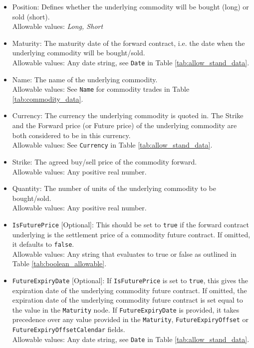 \begin{itemize}
\item Position: Defines whether the underlying commodity will be bought (long) or sold (short). \\
Allowable values: \emph{Long, Short}

\item Maturity: The maturity date of the forward contract, i.e. the date when the underlying commodity will be bought/sold. \\
Allowable values: Any date string, see \lstinline!Date! in Table \ref{tab:allow_stand_data}.

\item Name: The name of the underlying commodity. \\
Allowable values:  See \lstinline!Name! for commodity trades in Table \ref{tab:commodity_data}. \\

\item Currency: The  currency the underlying commodity is quoted in. The Strike and the Forward price (or Future price) of the underlying commodity are both considered to be in this currency.   \\
Allowable values:  See \lstinline!Currency! in Table \ref{tab:allow_stand_data}.	

\item Strike: The agreed buy/sell price of the commodity forward. \\
Allowable values:  Any positive real number.

\item Quantity: The number of units of the underlying commodity to be bought/sold. \\
Allowable values:  Any positive real number.

\item \lstinline!IsFuturePrice! [Optional]: This should be set to \lstinline!true! if the forward contract underlying is the settlement price of a commodity future contract. If omitted, it defaults to \lstinline!false!. \\
Allowable values: Any string that evaluates to true or false as outlined in Table \ref{tab:boolean_allowable}.

\item \lstinline!FutureExpiryDate! [Optional]: If \lstinline!IsFuturePrice! is set to \lstinline!true!, this gives the expiration date of the underlying commodity future contract. If omitted, the expiration date of the underlying commodity future contract is set equal to the value in the \lstinline!Maturity! node. If \lstinline!FutureExpiryDate! is provided, it takes precedence over any value provided in the \lstinline!Maturity!,  \lstinline!FutureExpiryOffset! or \lstinline!FutureExpiryOffsetCalendar! fields. \\
Allowable values: Any date string, see \lstinline!Date! in Table \ref{tab:allow_stand_data}.


\end{itemize}
